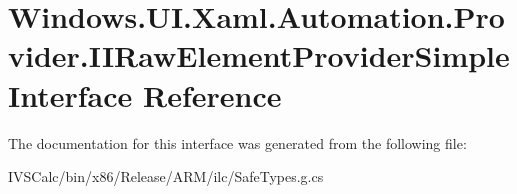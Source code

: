 \hypertarget{interface_windows_1_1_u_i_1_1_xaml_1_1_automation_1_1_provider_1_1_i_i_raw_element_provider_simple}{}\section{Windows.\+U\+I.\+Xaml.\+Automation.\+Provider.\+I\+I\+Raw\+Element\+Provider\+Simple Interface Reference}
\label{interface_windows_1_1_u_i_1_1_xaml_1_1_automation_1_1_provider_1_1_i_i_raw_element_provider_simple}


The documentation for this interface was generated from the following file\+:\begin{DoxyCompactItemize}
\item 
I\+V\+S\+Calc/bin/x86/\+Release/\+A\+R\+M/ilc/Safe\+Types.\+g.\+cs\end{DoxyCompactItemize}
